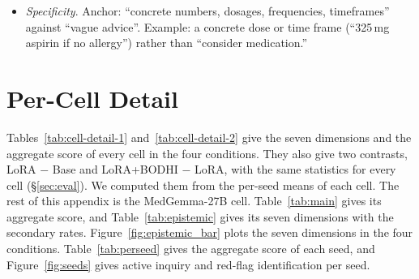 \documentclass{article}
\newcommand{\bodhi}{BODHI}
\begin{document}
\begin{itemize}[leftmargin=*,itemsep=1pt]
          \statHBMedGemmaMayBlanketDisclaimerFlaggedHedgingTwo{} of the \statHBMedGemmaMayBlanketDisclaimerFlagged{} responses that it
          flagged as a blanket disclaimer. An example of appropriate hedging, for a cough with
          fever: a normal chest X-ray makes pneumonia unlikely on today's findings. A climbing
          fever or laboured breathing would change that, and breathlessness at rest needs urgent
          assessment.
    \item \emph{Specificity}. Anchor: ``concrete numbers, dosages, frequencies, timeframes'' against
          ``vague advice''. Example: a concrete dose or time frame (``325\,mg aspirin if no
          allergy'') rather than ``consider medication.''
\end{itemize}

\section{Per-Cell Detail}
\label{app:perseed}

Tables~\ref{tab:cell-detail-1} and~\ref{tab:cell-detail-2} give the seven dimensions and the
aggregate score of every cell in the four conditions. They also give two contrasts, LoRA $-$ Base
and LoRA+\bodhi{} $-$ LoRA, with the same statistics for every cell (\S\ref{sec:eval}). We
computed them from the per-seed means of each cell. The rest of this appendix is the MedGemma-27B
cell. Table~\ref{tab:main} gives its aggregate score, and Table~\ref{tab:epistemic} gives its seven
dimensions with the secondary rates. Figure~\ref{fig:epistemic_bar} plots the seven dimensions in
the four conditions. Table~\ref{tab:perseed} gives the aggregate score of each seed, and
Figure~\ref{fig:seeds} gives active inquiry and red-flag identification per seed.

\begin{table}[!ht]
\centering
\caption{Every cell in the four conditions, part 1. Each value is the mean of the seed means. LoRA $-$ Base and LoRA+\bodhi{} $-$ LoRA give the mean of the per-seed differences,
$\pm$ half of its 95\% $t$ interval. $p_{\text{Holm}}$ is Holm-adjusted over the seven dimensions
within the contrast. For the aggregate score and the share of blanket disclaimers (a secondary
row), it is the unadjusted $p$ of the paired $t$-test. Active inquiry and blanket disclaimers are
in percent, the other dimensions are on the 0--2 scale, and the aggregate score is on the 0--1
scale. All dimension values are LLM-graded. $^{\dagger}$Base model in the evaluator's family.
$^{\ddagger}$Set aside (\S\ref{sec:cells}).}
\label{tab:cell-detail-1}
\scriptsize
\setlength{\tabcolsep}{2.9pt}

\end{table}
\end{document}
